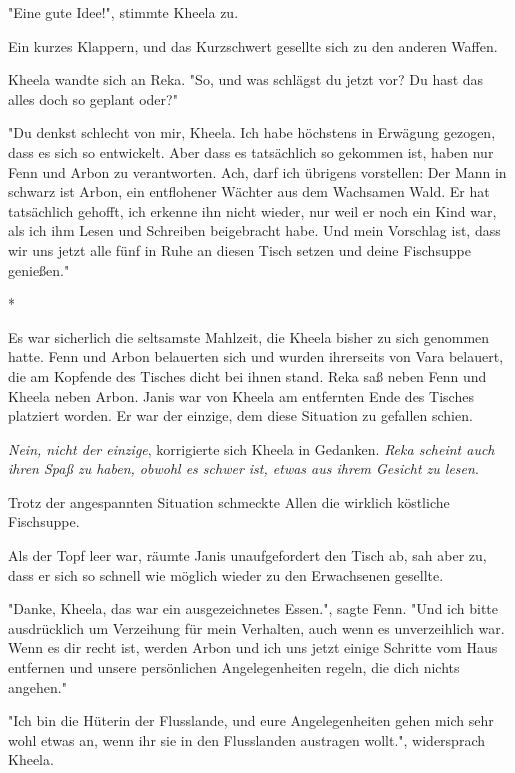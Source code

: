 \documentclass[10pt, a4paper, oneside]{book}
\begin{document}
\begin{multicols}{2}
"Eine gute Idee!", stimmte Kheela zu.

Ein kurzes Klappern, und das Kurzschwert gesellte sich zu den anderen Waffen. 

Kheela wandte sich an Reka. "So, und was schlägst du jetzt vor? Du hast das 
alles doch so geplant oder?"

"Du denkst schlecht von mir, Kheela. Ich habe höchstens in Erwägung gezogen, dass es sich so entwickelt. Aber dass es tatsächlich so gekommen ist, haben nur Fenn und Arbon zu verantworten. Ach, darf ich übrigens vorstellen: Der Mann in schwarz ist Arbon, ein entflohener Wächter aus dem Wachsamen Wald. Er hat tatsächlich gehofft, ich erkenne ihn nicht wieder, nur weil er noch ein Kind war, als ich ihm Lesen und Schreiben beigebracht habe. Und mein Vorschlag ist, dass wir uns jetzt alle fünf in Ruhe an diesen Tisch setzen und deine Fischsuppe genießen." 

\begin{center}
    * 
\end{center}

Es war sicherlich die seltsamste Mahlzeit, die Kheela bisher zu sich genommen 
hatte. Fenn und Arbon belauerten sich und wurden ihrerseits von Vara belauert, die am Kopfende des Tisches dicht bei ihnen stand. Reka saß neben Fenn und Kheela neben Arbon. Janis war von Kheela am entfernten Ende des Tisches platziert worden. Er war der einzige, dem diese Situation zu gefallen schien. 

\textit{Nein, nicht der einzige}, korrigierte sich Kheela in Gedanken. \textit{Reka scheint auch ihren Spaß zu haben, obwohl es schwer ist, etwas aus ihrem Gesicht zu lesen}. 

Trotz der angespannten Situation schmeckte Allen die wirklich köstliche Fischsuppe. 

Als der Topf leer war, räumte Janis unaufgefordert den Tisch ab, sah aber zu, dass er sich so schnell wie möglich wieder zu den Erwachsenen gesellte. 

"Danke, Kheela, das war ein ausgezeichnetes Essen.", sagte Fenn. "Und ich bitte ausdrücklich um Verzeihung für mein Verhalten, auch wenn es unverzeihlich war. Wenn es dir recht ist, werden Arbon und ich uns jetzt einige Schritte vom Haus entfernen und unsere persönlichen Angelegenheiten regeln, die dich nichts angehen." 

"Ich bin die Hüterin der Flusslande, und eure Angelegenheiten gehen mich sehr wohl etwas an, wenn ihr sie in den Flusslanden austragen wollt.", widersprach Kheela. 


\end{multicols}
\end{document}
